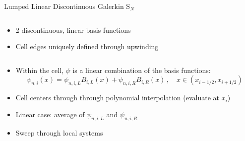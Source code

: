 \documentclass[10pt]{beamer}
\newcommand{\SN}{S$_N$\xspace}
\begin{document}
\begin{frame}{Lumped Linear Discontinuous Galerkin \SN}

	\begin{columns}

		\begin{column}{.5\textwidth}
		\vspace{.1in}
		\begin{itemize}

			\item 
			2 discontinuous, linear basis functions 

			\item 
			Cell edges uniquely defined through upwinding 


		\end{itemize}
		\end{column}
		\begin{column}{.5\textwidth}

			\begin{figure}

				\def\svgwidth{\textwidth}
				
				
			\end{figure}

		\end{column}

	\end{columns} 

	\begin{columns}
	\begin{column}{1.06\textwidth}
	\begin{itemize}

		\item 
		Within the cell, $\psi$ is a linear combination of the basis functions:
		\begin{equation*}
			\psi_{n,i}(x) = \psi_{n,i,L} B_{i,L}(x) + \psi_{n,i,R} B_{i,R}(x) \,, \quad x \in (x_{i-1/2},x_{i+1/2})
		\end{equation*}
		\item 
		Cell centers through through polynomial interpolation (evaluate at $x_i$) 

		\item 
		Linear case: average of $\psi_{n,i,L}$ and $\psi_{n,i,R}$ 

		\item Sweep through local systems 

	\end{itemize}

	\end{column}
	\end{columns}

\end{frame}
\end{document}
